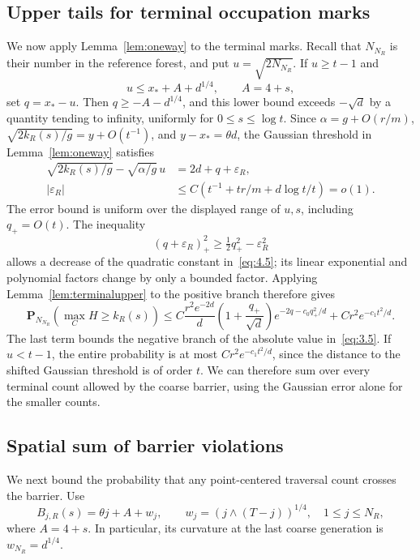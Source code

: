 \documentclass[11pt,a4paper]{article}
\numberwithin{equation}{section}
\theoremstyle{remark}
\begin{document}
\subsection{Upper tails for terminal occupation marks}\label{sec:terminalmarksupper}
We now apply Lemma~\ref{lem:oneway} to the terminal marks. Recall that $N_{N_R}$ is their number in the reference forest, and put $u=\sqrt{2N_{N_R}}$. If $u\ge t-1$ and
\[
u\le x_*+A+d^{1/4},\qquad A=4+s,
\]
set $q=x_*-u$. Then $q\ge-A-d^{1/4}$, and this lower bound exceeds $-\sqrt d$ by a quantity tending to infinity, uniformly for $0\le s\le\log t$. Since $\alpha=g+O(r/m)$, $\sqrt{2k_R(s)/g}=y+O(t^{-1})$, and $y-x_*=\theta d$, the Gaussian threshold in Lemma~\ref{lem:oneway} satisfies
\begin{equation}\label{eq:4.10}
\begin{split}
\sqrt{2k_R(s)/g}-\sqrt{\alpha/g}\,u
&=2d+q+\varepsilon_R,\\
|\varepsilon_R|
&\le C\left(t^{-1}+tr/m+d\log t/t\right)=o(1).
\end{split}
\end{equation}
The error bound is uniform over the displayed range of $u,s$, including $q_+=O(t)$. The inequality
\[
(q+\varepsilon_R)_+^2\ge\tfrac12q_+^2-\varepsilon_R^2
\]
allows a decrease of the quadratic constant in~\eqref{eq:4.5}; its linear exponential and polynomial factors change by only a bounded factor. Applying Lemma~\ref{lem:terminalupper} to the positive branch therefore gives
\begin{equation}\label{eq:4.11}
\mathbf P_{N_{N_R}}(\max_CH\ge k_R(s))
\le C\frac{r^2e^{-2d}}d
\left(1+\frac{q_+}{\sqrt d}\right)e^{-2q-c_0q_+^2/d}
+Cr^2e^{-c_1t^2/d}.
\end{equation}
The last term bounds the negative branch of the absolute value in~\eqref{eq:3.5}. If $u<t-1$, the entire probability is at most $Cr^2e^{-c_1t^2/d}$, since the distance to the shifted Gaussian threshold is of order $t$. We can therefore sum over every terminal count allowed by the coarse barrier, using the Gaussian error alone for the smaller counts.

\subsection{Spatial sum of barrier violations}\label{sec:barrierviolations}
We next bound the probability that any point-centered traversal count crosses the barrier. Use
\begin{equation}\label{eq:4.12}
B_{j,R}(s)=\theta j+A+w_j,\qquad
w_j=(j\wedge(T-j))^{1/4},\quad 1\le j\le N_R,
\end{equation}
where $A=4+s$. In particular, its curvature at the last coarse generation is $w_{N_R}=d^{1/4}$.
\end{document}
